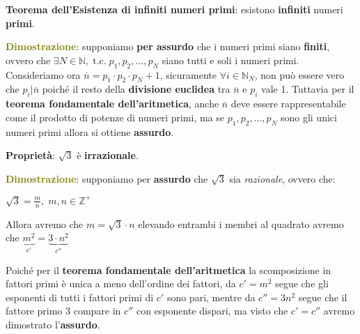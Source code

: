 \begin{flushleft}
    \textbf{Teorema dell'Esistenza di infiniti numeri primi}: esistono \textbf{infiniti} numeri \textbf{primi}.
    \begin{boxA}
        \textcolor{olive}{\textbf{Dimostrazione}}: supponiamo \textbf{per assurdo} che i numeri primi siano \textbf{finiti}, ovvero che $\exists N \in \mathbb{N}, \; \text{t.c.} \; p_1, p_2, ..., p_N$ siano tutti e soli i numeri primi. Consideriamo ora $\overline{n} = p_1 \cdot p_2 \cdot p_N + 1$, sicuramente $\forall i \in \mathbb{N}_N$, non può essere vero che $p_i|\overline{n}$ poiché il resto della \textbf{divisione euclidea} tra $\overline{n}$ e $p_i$ vale 1. Tuttavia per il \textbf{teorema fondamentale dell'aritmetica}, anche $\overline{n}$ deve essere rappresentabile come il prodotto di potenze di numeri primi, ma se $p_1, p_2, ..., p_N$ sono gli unici numeri primi allora si ottiene \textbf{assurdo}.
    \end{boxA}
\end{flushleft}

\newpage
\begin{flushleft}
    \textbf{Proprietà}: $\sqrt{3}$ è \textbf{irrazionale}.

    \begin{boxA}
        \textcolor{olive}{\textbf{Dimostrazione}}: supponiamo per \textbf{assurdo} che $\sqrt{3}$ sia \textit{razionale}, ovvero che:
        
        {\centering
            $\sqrt{3} = \frac{m}{n}, \; m, n \in \mathbb{Z}^+$
        \par}
        Allora avremo che $m = \sqrt{3} \cdot n$ elevando entrambi i membri al quadrato avremo che $\underset{c'}{\underbrace{m^2}} = \underset{c''}{\underbrace{3 \cdot n^2}}$

        Poiché per il \textbf{teorema fondamentale dell'aritmetica} la scomposizione in fattori primi è unica a meno dell'ordine dei fattori, da $c' = m^2$ segue che gli esponenti di tutti i fattori primi di $c'$ sono pari, mentre da $c'' = 3n^2$ segue che il fattore primo $3$ compare in $c''$ con esponente dispari, ma visto che $c' = c''$ avremo dimostrato l'\textbf{assurdo}.
    \end{boxA}
\end{flushleft}

